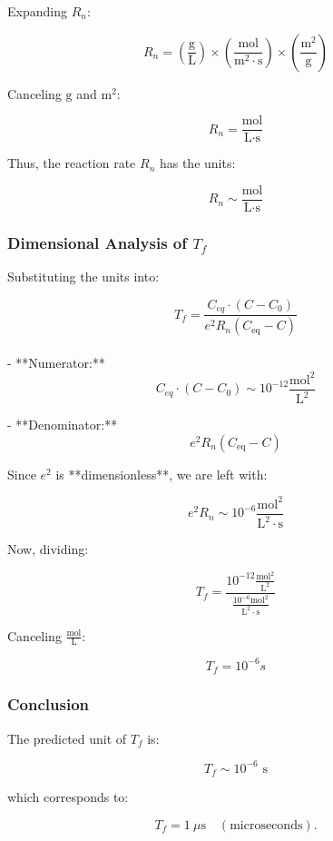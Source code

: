 Expanding \( R_n \):

\[
R_n = \left(\frac{\text{g}}{\text{L}}\right) \times \left(\frac{\text{mol}}{\text{m}^2 \cdot \text{s}}\right) \times \left(\frac{\text{m}^2}{\text{g}}\right)
\]

Canceling \( \text{g} \) and \( \text{m}^2 \):

\[
R_n = \frac{\text{mol}}{\text{L} \cdot \text{s}}
\]

Thus, the reaction rate \( R_n \) has the units:

\[
R_n \sim \frac{\text{mol}}{\text{L} \cdot \text{s}}
\]

\subsubsection*{Dimensional Analysis of \( T_f \)}

Substituting the units into:


\begin{equation}
    T_f = \frac{C_{eq} \cdot \left(C - C_0\right)}{e^2 R_n \left( C_{\text{eq}} - C \right)}
\end{equation}\\


- **Numerator:**  
  \[
   C_{eq} \cdot \left(C - C_0\right) \sim 10^{-12} \frac{\text{mol}^2}{\text{L}^2}
  \]

- **Denominator:**  
  \[
  e^2 R_n \left( C_{\text{eq}} - C \right) 
  \]

  Since \( e^2 \) is **dimensionless**, we are left with:

  \[
  e^2 R_n \sim 10^{-6} \frac{\text{mol}^2}{\text{L}^2 \cdot \text{s}}
  \]

Now, dividing:

\[
T_f = \frac{10^{-12} \frac{\text{mol}^2}{\text{L}^2}}{\frac{10^{-6}\text{mol}^2}{\text{L}^2 \cdot \text{s}}}
\]

Canceling \( \frac{\text{mol}}{\text{L}} \):

\[
T_f = 10^{-6} s
\]

\subsubsection*{Conclusion}

The predicted unit of \( T_f \) is:

\[
T_f \sim 10^{-6} \text{ s}
\]

which corresponds to:

\[
T_f = 1~\mu\text{s} \quad (\text{microseconds}).
\]


